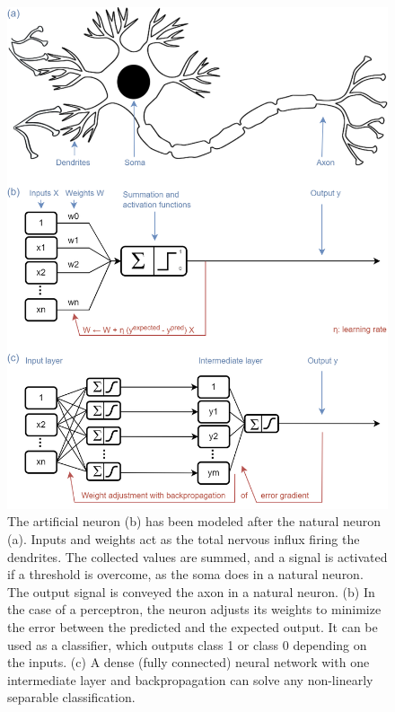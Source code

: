 \begin{figure}[!ht]
	\centering
	\def\svgwidth{1\columnwidth}
	\fontsize{10pt}{10pt}\selectfont
	\includegraphics[width=0.95\linewidth]{"../Chap2/Figures/Fig_neuron.png"}
	\caption{The artificial neuron (b) has been modeled after the natural neuron (a). Inputs and weights act as the total nervous influx firing the dendrites. The collected values are summed, and a signal is activated if a threshold is overcome, as the soma does in a natural neuron. The output signal is conveyed the axon in a natural neuron. (b) In the case of a perceptron, the neuron adjusts its weights to minimize the error between the predicted and the expected output. It can be used as a classifier, which outputs class 1 or class 0 depending on the inputs. (c) A dense (fully connected) neural network with one intermediate layer and backpropagation can solve any non-linearly separable classification.}
	\label{fig_neuron}
\end{figure}

